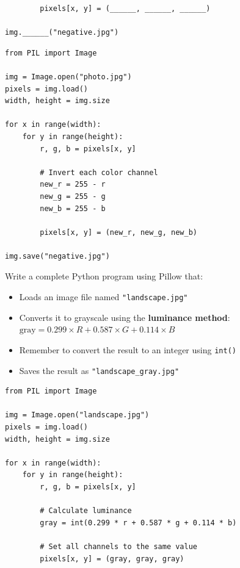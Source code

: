 \documentclass{csexam}
\begin{document}
\begin{questions}
\begin{lstlisting}
        pixels[x, y] = (______, ______, ______)

img.______("negative.jpg")
\end{lstlisting}

\begin{solution}
\begin{lstlisting}
from PIL import Image

img = Image.open("photo.jpg")
pixels = img.load()
width, height = img.size

for x in range(width):
    for y in range(height):
        r, g, b = pixels[x, y]

        # Invert each color channel
        new_r = 255 - r
        new_g = 255 - g
        new_b = 255 - b

        pixels[x, y] = (new_r, new_g, new_b)

img.save("negative.jpg")
\end{lstlisting}
\end{solution}

\newpage

\question[15] Write a complete Python program using Pillow that:
\begin{itemize}
    \item Loads an image file named \texttt{"landscape.jpg"}
    \item Converts it to grayscale using the \textbf{luminance method}:\\
    $\text{gray} = 0.299 \times R + 0.587 \times G + 0.114 \times B$
    \item Remember to convert the result to an integer using \texttt{int()}
    \item Saves the result as \texttt{"landscape\_gray.jpg"}
\end{itemize}

\vspace{10cm}

\begin{solution}
\begin{lstlisting}
from PIL import Image

img = Image.open("landscape.jpg")
pixels = img.load()
width, height = img.size

for x in range(width):
    for y in range(height):
        r, g, b = pixels[x, y]

        # Calculate luminance
        gray = int(0.299 * r + 0.587 * g + 0.114 * b)

        # Set all channels to the same value
        pixels[x, y] = (gray, gray, gray)


\end{lstlisting}
\end{solution}
\end{questions}
\end{document}
